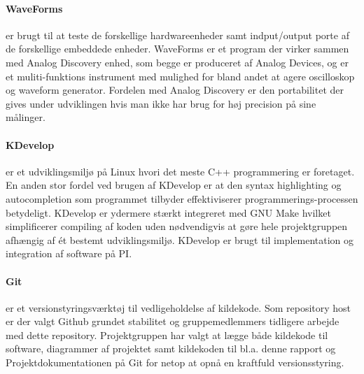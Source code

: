 \paragraph{WaveForms} er brugt til at teste de forskellige hardwareenheder samt indput/output porte af de forskellige embeddede enheder. WaveForms er et program der virker sammen med Analog Discovery enhed, som begge er produceret af Analog Devices, og er et muliti-funktions instrument med mulighed for bland andet at agere oscilloskop og waveform generator. Fordelen med Analog Discovery er den portabilitet der gives under udviklingen hvis man ikke har brug for høj precision på sine målinger.

\paragraph{KDevelop} er et udviklingsmiljø på Linux hvori det meste C++ programmering er foretaget. En anden stor fordel ved brugen af KDevelop er at den syntax highlighting og autocompletion som programmet tilbyder effektiviserer programmerings-processen betydeligt. KDevelop er ydermere stærkt integreret med GNU Make\cite{lib:GNU_make} hvilket simplificerer compiling af koden uden nødvendigvis at gøre hele projektgruppen afhængig af ét bestemt udviklingsmiljø. KDevelop er brugt til implementation og integration af software på PI.

\paragraph{Git} er et versionstyringsværktøj til vedligeholdelse af kildekode. Som repository host er der valgt Github grundet stabilitet og gruppemedlemmers tidligere arbejde med dette repository. Projektgruppen har valgt at lægge både kildekode til software, diagrammer af projektet samt kildekoden til bl.a. denne rapport og Projektdokumentationen på Git for netop at opnå en kraftfuld versionsstyring\cite{lib:au2_git}.
